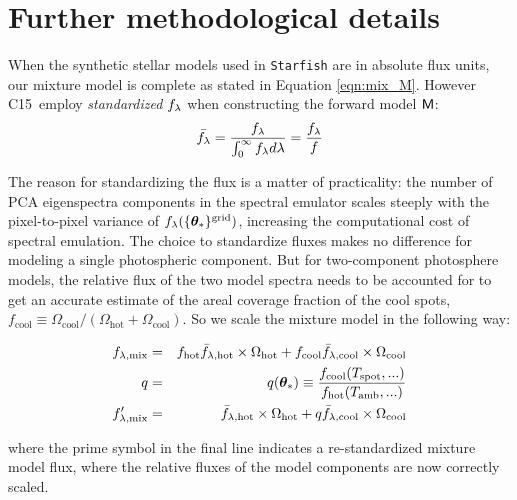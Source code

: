 \documentclass[twocolumn]{emulateapj}%
\newcommand{\iancze}{{\sc C15}}
\begin{document}
\clearpage
\pagebreak


\appendix

\section{Further methodological details}
\label{methods-details}

When the synthetic stellar models used in \texttt{Starfish} are in absolute flux units, our mixture model is complete as stated in Equation \ref{eqn:mix_M}.  However \iancze\ employ \emph{standardized} $f_\lambda$ when constructing the forward model $\mathsf{M}$:
\begin{eqnarray} \label{eqn:normalization}
\bar {f_\lambda} = \frac{f_\lambda}{\int_{0}^{\infty} f_\lambda d\lambda} = \frac{f_\lambda}{f}
\end{eqnarray}

The reason for standardizing the flux is a matter of practicality: the number of PCA eigenspectra components in the spectral emulator scales steeply with the pixel-to-pixel variance of $f_{\lambda}(\{{\bm \theta}_{\ast}\}^\textrm{grid})$, increasing the computational cost of spectral emulation.  The choice to standardize fluxes makes no difference for modeling a single photospheric component.  But for two-component photosphere models, the relative flux of the two model spectra needs to be accounted for to get an accurate estimate of the areal coverage fraction of the cool spots, $f_{\mathrm{cool}} \equiv \Omega_{\mathrm{cool}}/(\Omega_{\mathrm{hot}}+\Omega_{\mathrm{cool}})$.  So we scale the mixture model in the following way:

\begin{eqnarray} \label{eqn:norm_scaling}
f_{\lambda, \mathrm{mix}} &=& f_{\mathrm{hot}} \bar f_{\lambda, \mathrm{hot}} \times \Omega_{\mathrm{hot}} + f_{\mathrm{cool}} \bar f_{\lambda, \mathrm{cool}} \times \Omega_{\mathrm{cool}} \\
q &=& q({\bm \theta}_{\ast})\equiv \frac{f_{\mathrm{cool}}(T_\textrm{spot}, ...)}{f_{\mathrm{hot}}(T_\textrm{amb}, ...)} \\
f_{\lambda, \mathrm{mix}}^{\prime} &=& \bar f_{\lambda, \mathrm{hot}} \times \Omega_{\mathrm{hot}} + q \bar f_{\lambda, \mathrm{cool}} \times \Omega_{\mathrm{cool}}
\end{eqnarray}

where the prime symbol in the final line indicates a re-standardized mixture model flux, where the relative fluxes of the model components are now correctly scaled.
\end{document}
